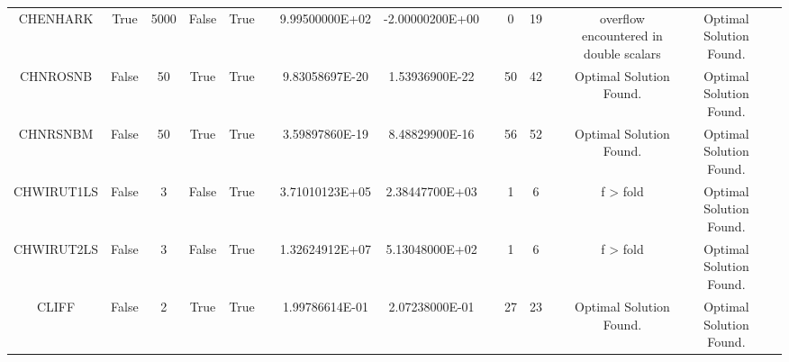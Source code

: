 \begin{longtable}{ccccccccccccccc}
	\cellcolor{default2} CHENHARK& \cellcolor{default2} True& \cellcolor{default2} 5000& \cellcolor{default2} False& \cellcolor{default2} True& \cellcolor{header} & \cellcolor{poor} 9.99500000E+02& \cellcolor{best} -2.00000200E+00& \cellcolor{header} & \cellcolor{best} 0& \cellcolor{poor} 19& \cellcolor{header} & \cellcolor{default2} overflow encountered in double scalars& \cellcolor{default2} Optimal Solution Found.& \cellcolor{header} \\
	\cellcolor{default1} CHNROSNB& \cellcolor{default1} False& \cellcolor{default1} 50& \cellcolor{default1} True& \cellcolor{default1} True& \cellcolor{header} & \cellcolor{ok} 9.83058697E-20& \cellcolor{best} 1.53936900E-22& \cellcolor{header} & \cellcolor{ok} 50& \cellcolor{best} 42& \cellcolor{header} & \cellcolor{default1} Optimal Solution Found.& \cellcolor{default1} Optimal Solution Found.& \cellcolor{header} \\
	\cellcolor{default2} CHNRSNBM& \cellcolor{default2} False& \cellcolor{default2} 50& \cellcolor{default2} True& \cellcolor{default2} True& \cellcolor{header} & \cellcolor{best} 3.59897860E-19& \cellcolor{ok} 8.48829900E-16& \cellcolor{header} & \cellcolor{ok} 56& \cellcolor{best} 52& \cellcolor{header} & \cellcolor{default2} Optimal Solution Found.& \cellcolor{default2} Optimal Solution Found.& \cellcolor{header} \\
	\cellcolor{default1} CHWIRUT1LS& \cellcolor{default1} False& \cellcolor{default1} 3& \cellcolor{default1} False& \cellcolor{default1} True& \cellcolor{header} & \cellcolor{poor} 3.71010123E+05& \cellcolor{best} 2.38447700E+03& \cellcolor{header} & \cellcolor{best} 1& \cellcolor{poor} 6& \cellcolor{header} & \cellcolor{default1} f > fold& \cellcolor{default1} Optimal Solution Found.& \cellcolor{header} \\
	\cellcolor{default2} CHWIRUT2LS& \cellcolor{default2} False& \cellcolor{default2} 3& \cellcolor{default2} False& \cellcolor{default2} True& \cellcolor{header} & \cellcolor{poor} 1.32624912E+07& \cellcolor{best} 5.13048000E+02& \cellcolor{header} & \cellcolor{best} 1& \cellcolor{poor} 6& \cellcolor{header} & \cellcolor{default2} f > fold& \cellcolor{default2} Optimal Solution Found.& \cellcolor{header} \\
	\cellcolor{default1} CLIFF& \cellcolor{default1} False& \cellcolor{default1} 2& \cellcolor{default1} True& \cellcolor{default1} True& \cellcolor{header} & \cellcolor{best} 1.99786614E-01& \cellcolor{poor} 2.07238000E-01& \cellcolor{header} & \cellcolor{ok} 27& \cellcolor{best} 23& \cellcolor{header} & \cellcolor{default1} Optimal Solution Found.& \cellcolor{default1} Optimal Solution Found.& \cellcolor{header} \\

\end{longtable}
